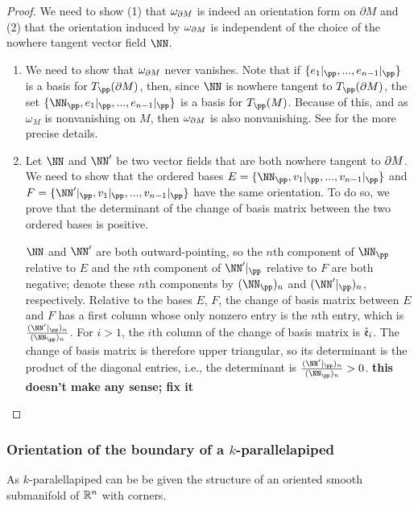 \begin{proof}
    We need to show (1) that $\omega_{\partial M}$ is indeed an orientation form on $\partial M$ and (2) that the orientation induced by $\omega_{\partial M}$ is independent of the choice of the nowhere tangent vector field $\NN$.
        
    \begin{enumerate}
        \item We need to show that $\omega_{\partial M}$ never vanishes. Note that if $\{e_1|_\pp, ..., e_{n - 1}|_\pp\}$ is a basis for $T_\pp(\pd M)$, then, since $\NN$ is nowhere tangent to $T_\pp(\pd M)$, the set $\{\NN_\pp, e_1|_\pp, ..., e_{n - 1}|_\pp\}$ is a basis for $T_\pp(M)$. Because of this, and as $\omega_M$ is nonvanishing on $M$, then $\omega_{\partial M}$ is also nonvanishing. See \cite[p. 385]{book::SM} for the more precise details.
    
        \item Let $\NN$ and $\NN'$ be two vector fields that are both nowhere tangent to $\partial M$. We need to show that the ordered bases $E = \{\NN_\pp, v_1|_\pp, ..., v_{n - 1}|_\pp\}$ and $F = \{\NN'|_\pp, v_1|_\pp, ..., v_{n - 1}|_\pp\}$ have the same orientation. To do so, we prove that the determinant of the change of basis matrix between the two ordered bases is positive.
            
        $\NN$ and $\NN'$ are both outward-pointing, so the $n$th component of $\NN_\pp$ relative to $E$ and the $n$th component of $\NN'|_\pp$ relative to $F$ are both negative; denote these $n$th components by $(\NN_\pp)_n$ and $(\NN'|_\pp)_n$, respectively. Relative to the bases $E$, $F$, the change of basis matrix between $E$ and $F$ has a first column whose only nonzero entry is the $n$th entry, which is $\frac{(\NN'|_\pp)_n}{(\NN_\pp)_n}$. For $i > 1$, the $i$th column of the change of basis matrix is $\hat{\mathfrak{e}}_i$. The change of basis matrix is therefore upper triangular, so its determinant is the product of the diagonal entries, i.e., the determinant is $\frac{(\NN'|_\pp)_n}{(\NN_\pp)_n} > 0$. \textbf{this doesn't make any sense; fix it}
    \end{enumerate}
\end{proof}

\subsubsection*{Orientation of the boundary of a $k$-parallelapiped}

As $k$-paralellapiped can be be given the structure of an oriented smooth submanifold of $\mathbb{R}^n$ with corners. 

